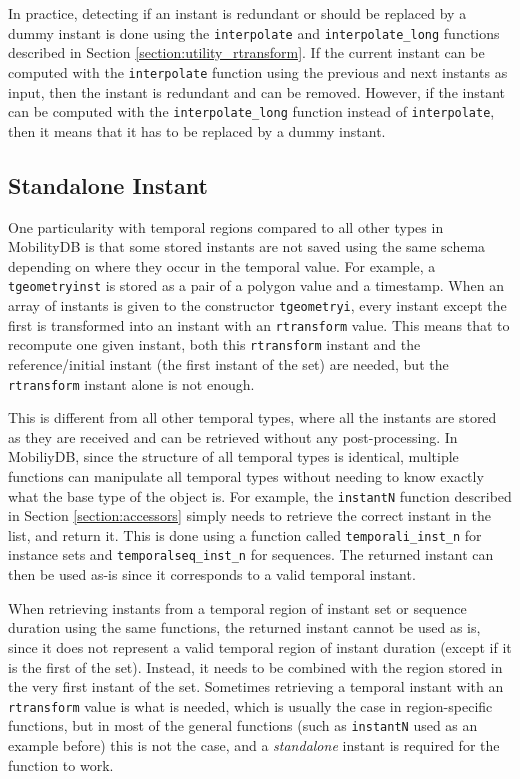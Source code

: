 In practice, detecting if an instant is redundant or should be replaced by a dummy instant is done using the \lstinline{interpolate} and \lstinline{interpolate_long} functions described in Section \ref{section:utility_rtransform}. If the current instant can be computed with the \lstinline{interpolate} function using the previous and next instants as input, then the instant is redundant and can be removed. However, if the instant can be computed with the \lstinline{interpolate_long} function instead of \lstinline{interpolate}, then it means that it has to be replaced by a dummy instant.

\subsection{Standalone Instant}
\label{section:standalone_inst}

One particularity with temporal regions compared to all other types in MobilityDB is that some stored instants are not saved using the same  schema depending on where they occur in the temporal value. For example, a \lstinline{tgeometryinst} is stored as a pair of a polygon value and a timestamp. When an array of instants is given to the constructor \lstinline{tgeometryi}, every instant except the first is transformed into an instant with an \lstinline{rtransform} value. This means that to recompute one given instant, both this \lstinline+rtransform+ instant and the reference/initial instant (the first instant of the set) are needed, but the \lstinline+rtransform+ instant alone is not enough. 

This is different from all other temporal types, where all the instants are stored as they are received and can be retrieved without any post-processing. In MobiliyDB, since the structure of all temporal types is identical, multiple functions can manipulate all temporal types without needing to know exactly what the base type of the object is. For example, the \lstinline{instantN} function described in Section \ref{section:accessors} simply needs to retrieve the correct instant in the list, and return it. This is done using a function called \lstinline{temporali_inst_n} for instance sets and \lstinline{temporalseq_inst_n} for sequences. The returned instant can then be used as-is since it corresponds to a valid temporal instant.

When retrieving instants from a temporal region of instant set or sequence duration using the same functions, the returned instant cannot be used as is, since it does not represent a valid temporal region of instant duration (except if it is the first of the set). Instead, it needs to be combined with the region stored in the very first instant of the set. Sometimes retrieving a temporal instant with an \lstinline+rtransform+ value is what is needed, which is usually the case in region-specific functions, but in most of the general functions (such as \lstinline{instantN} used as an example before) this is not the case, and a \textit{standalone} instant is required for the function to work.

